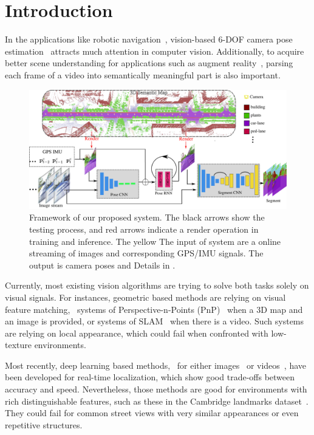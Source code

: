\section{Introduction}
\label{sec:introduction}
In the applications like robotic navigation~\cite{ohno2003outdoor}, vision-based 6-DOF camera pose estimation~\cite{campbell2017globally,moreno2008pose,Kendall_2015_ICCV,coskun2017long} attracts much attention in computer vision.
Additionally, to acquire better scene understanding for applications such as augment reality~\cite{DBLP:journals/corr/abs-1708-05006}, parsing each frame of a video into semantically meaningful part is also important.

\begin{figure}[t]
\includegraphics[width=\textwidth]{fig/framework.pdf}
\caption{Framework of our proposed system. The black arrows show the testing process, and red arrows indicate a render operation in training and inference. The yellow  The input of system are a online streaming of images and corresponding GPS/IMU signals. The output is camera poses and 
Details in .}
\label{fig:framework}
\end{figure}

Currently, most existing vision algorithms are trying to solve both tasks solely on visual signals.
For instances, geometric based methods are relying on visual feature matching, \eg~systems of Perspective-n-Points (PnP)~\cite{haralick1994review,kneip2014upnp,campbell2017globally} when a 3D map and an image is provided, or systems of SLAM~\cite{engel2014lsd,mur2015orb,NewcombeLD11} when there is a video. Such systems are relying on local appearance, which could fail when confronted with low-texture environments.

Most recently, deep learning based methods, \eg~for either images~\cite{Kendall_2015_ICCV} or videos~\cite{DBLP:journals/corr/ClarkWMTW17}, have been developed for real-time localization, which show good trade-offs between accuracy and speed.
Nevertheless, those methods are good for environments with rich distinguishable features, such as these in the Cambridge landmarks dataset~\cite{Kendall_2015_ICCV}. They could fail for common street views with very similar appearances or even repetitive structures. 

